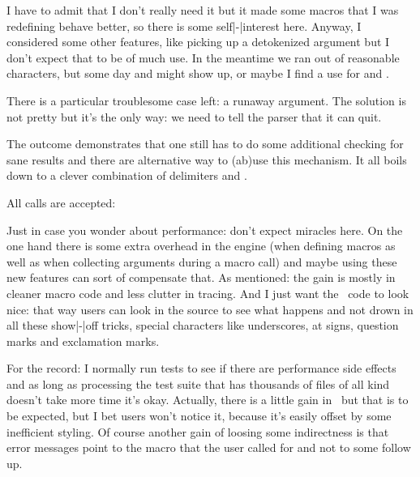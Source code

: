 \typebuffer[example][option=TEX] \startpacked \getbuffer[example] \stoppacked

I have to admit that I don't really need it but it made some macros that I was
redefining behave better, so there is some self|-|interest here. Anyway, I
considered some other features, like picking up a detokenized argument but I
don't expect that to be of much use. In the meantime we ran out of reasonable characters,
but some day  and \type {#!} might show up, or maybe I find a use for \type {#<}
and \type {#>}.

\stopsection

\startsection[title=Runaway arguments]

There is a particular troublesome case left: a runaway argument. The solution is
not pretty but it's the only way: we need to tell the parser that it can quit.

\startbuffer[definition]
\tolerant{}
\stopbuffer

\typebuffer[definition][option=TEX] \getbuffer[definition]

\startbuffer[example]
\dontleavehmode \foo[a=1]
\dontleavehmode \foo[b=]
\dontleavehmode \foo[=]
\dontleavehmode \foo[x]\ignorearguments
\stopbuffer

The outcome demonstrates that one still has to do some additional checking for sane
results and there are alternative way to (ab)use this mechanism. It all boils down
to a clever combination of delimiters and \type {\ignorearguments}.

\typebuffer[example][option=TEX]

All calls are accepted:

\startlines \getbuffer[example] \stoplines

Just in case you wonder about performance: don't expect miracles here. On the one
hand there is some extra overhead in the engine (when defining macros as well as
when collecting arguments during a macro call) and maybe using these new features
can sort of compensate that. As mentioned: the gain is mostly in cleaner macro
code and less clutter in tracing. And I just want the \CONTEXT\ code to look
nice: that way users can look in the source to see what happens and not drown in
all these show|-|off tricks, special characters like underscores, at signs,
question marks and exclamation marks.

For the record: I normally run tests to see if there are performance side effects
and as long as processing the test suite that has thousands of files of all kind
doesn't take more time it's okay. Actually, there is a little gain in \CONTEXT\
but that is to be expected, but I bet users won't notice it, because it's easily
offset by some inefficient styling. Of course another gain of loosing some
indirectness is that error messages point to the macro that the user called for
and not to some follow up.

